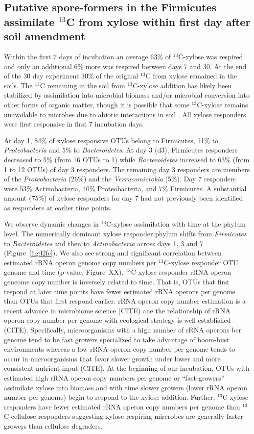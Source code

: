 \subsection{Putative spore-formers in the Firmicutes assimilate
$^{13}$C from xylose within first day after soil amendment} 
Within the first 7 days of incubation an average 63\% of $^{13}$C-xylose was
respired and only an additional 6\% more was respired between days 7 and 30. At
the end of the 30 day experiment 30\% of the original $^{13}$C from xylose
remained in the soils. The $^{13}$C remaining in the soil from $^{13}$C-xylose
addition has likely been stabilized by assimilation into microbial biomass
and/or microbial conversion into other forms of organic matter, though it is
possible that some $^{13}$C-xylose remains unavailable to microbes due to
abiotic interactions in soil \citep{Kalbitz_2000}. All xylose
responders were first responsive in first 7 incubation days. 

At day 1, 84\% of xylose responsive OTUs belong to Firmicutes, 11\% to
\textit{Proteobacteria} and 5\% to \textit{Bacteroidetes}. At day 3 (d3),
Firmicutes responders decreased to 5\% (from 16 OTUs to 1) while
\textit{Bacteroidetes} increased to 63\% (from 1 to 12 OTUs) of day 3
responders. The remaining day 3 responders are members of the
\textit{Proteobacteria} (26\%) and the \textit{Verrucomicrobia} (5\%). Day 7
responders were 53\% Actinobacteria, 40\% Proteobacteria, and 7\% Firmicutes. A
substantial amount (75\%) of xylose responders for day 7 had not previously
been identified as responders at earlier time points. 

We observe dynamic changes in $^{13}$C-xylose assimilation with time at the
phylum level. The numerically dominant xylose responder phylum shifts from
\textit{Firmicutes} to \textit{Bacteroidetes} and then to \textit{Actinobacteria}
across days 1, 3 and 7 (Figure~\ref{fig:l2fc}). We also see strong and significant
correlation between estimated rRNA operon genome copy numbers per $^{13}$C-xylose
responder OTU genome and time (p-value, Figure~XX). $^{13}$C-xylose responder
rRNA operon geneome copy number is inversely related to time. That is, OTUs
that first respond at later time points have fewer estimated rRNA operons per
genome than OTUs that first respond earlier. rRNA operon copy number estimation
is a recent advance in microbiome science (CITE) ane the relationship of rRNA
operon copy number per genome with ecological strategy is well established
(CITE). Specifically, microorganisms with a high number of rRNA operons ber
genome tend to be fast growers specialized to take advantage of boom-bust
environments whereas a low rRNA operon copy number per genome tends to occur in
microorganisms that favor slower growth under lower and more consistent
nutrient input (CITE). At the beginning of our incubation, OTUs with estimated
high rRNA operon copy numbers per genome or ``fast-growers'' assimilate xylose
into biomass and with time slower growers (lower rRNA operon number per genome)
begin to respond to the xylose addition. Further, $^{13}$C-xylose responders
have fewer estimated rRNA operon copy numbers per genome than
$^{13}$C-cellulose responders suggesting xylose respiring mircrobes are
generally faster growers than cellulose degraders.

